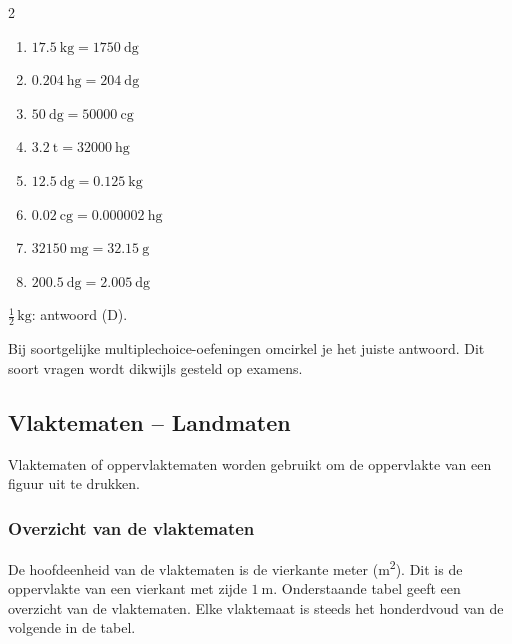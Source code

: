\documentclass{bis}
\begin{document}
\begin{solution}
\begin{multicols}{2}
\begin{enumerate}
  \item \(\SI{17.5}{\kilo\gram}=\SI{1750}{\deca\gram}\)
  \item \(\SI{0.204}{\hecto\gram}=\SI{204}{\deci\gram}\)
  \item \(\SI{50}{\deca\gram}=\SI{50000}{\centi\gram}\)
  \item \(\SI{3.2}{\tonne}=\SI{32000}{\hecto\gram}\)
  \item \(\SI{12.5}{\deca\gram}=\SI{0.125}{\kilo\gram}\)
  \item \(\SI{0.02}{\centi\gram}=\SI{0.000002}{\hecto\gram}\)
  \item \(\SI{32150}{\milli\gram}=\SI{32.15}{\gram}\)
  \item \(\SI{200.5}{\deci\gram}=\SI{2.005}{\deca\gram}\)
\end{enumerate}
\end{multicols}
\(\tfrac{1}{2}\,\si{\kilo\gram}\): antwoord (D).
\end{solution}

Bij soortgelijke multiplechoice-oefeningen omcirkel je het juiste antwoord. Dit soort vragen wordt dikwijls gesteld op examens.

\subsection{Vlaktematen -- Landmaten}
Vlaktematen of oppervlaktematen worden gebruikt om de oppervlakte van een figuur uit te drukken.

\subsubsection{Overzicht van de vlaktematen}
De hoofdeenheid van de vlaktematen is de vierkante meter (\si{\square\metre}). Dit is de oppervlakte van een vierkant met zijde \(\SI{1}{\metre}\). Onderstaande tabel geeft een overzicht van de vlaktematen. Elke vlaktemaat is steeds het honderdvoud van de volgende in de tabel.
\end{document}
